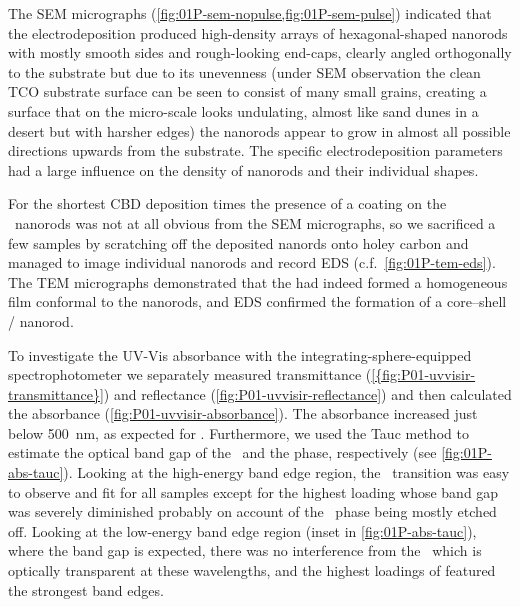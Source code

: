 \documentclass[draft,webedition,openright,titles,swedish,english]{LuaUUThesis}\usepackage[]{graphicx}\usepackage[]{xcolor}
\newcommand{\cf}{c.f.}
\begin{document}
The \gls{SEM} micrographs (\cref{fig:01P-sem-nopulse,fig:01P-sem-pulse})
indicated that the electrodeposition produced high-density
arrays of hexagonal-shaped nanorods with mostly smooth sides and rough-looking end-caps,
clearly angled orthogonally to the  substrate but due to its
unevenness (under \gls{SEM} observation the clean \gls{TCO} substrate surface
can be seen to consist of many small grains, creating a surface that on the
micro-scale looks undulating, almost like sand dunes in a desert but with harsher edges)
the nanorods appear to grow in almost all possible directions upwards from the substrate.
The specific electrodeposition parameters had a large influence on the density
of nanorods and their individual shapes.


For the shortest \gls{CBD} deposition times the presence of a  coating
on the \ZnO\ nanorods was not at all obvious from the \gls{SEM} micrographs,
so we sacrificed a few samples by scratching off the deposited nanords onto holey carbon
and managed to image individual nanorods and record \gls{EDS} (\cf\ \cref{fig:01P-tem-eds}).
The \gls{TEM} micrographs demonstrated that the  had indeed formed a
homogeneous film conformal to the nanorods, and \gls{EDS} confirmed
the formation of a core--shell \ZnO/ nanorod.

To investigate the \gls{UV-Vis} absorbance with the integrating-sphere-equipped
spectrophotometer we separately measured transmittance (\cref{{fig:P01-uvvisir-transmittance}})
and reflectance (\cref{fig:P01-uvvisir-reflectance}) and then calculated
the absorbance (\cref{fig:P01-uvvisir-absorbance}).
The absorbance increased just below \qty{500}{\nm}, as expected for .
Furthermore, we used the Tauc method to estimate the optical band gap of the
\zincox\ and the  phase, respectively (see \cref{fig:01P-abs-tauc}).
Looking at the high-energy band edge region, the \zincox\ transition was easy to
observe and fit for all samples except for the highest  loading whose
band gap was severely diminished probably on account of the \zincox\ phase
being mostly etched off.
Looking at the low-energy band edge region (inset in \cref{fig:01P-abs-tauc}),
where the  band gap is expected, there was no interference from the \zincox\
which is optically transparent at these wavelengths, and the highest loadings
of \ch{CdS} featured the strongest band edges.

%
\end{document}
